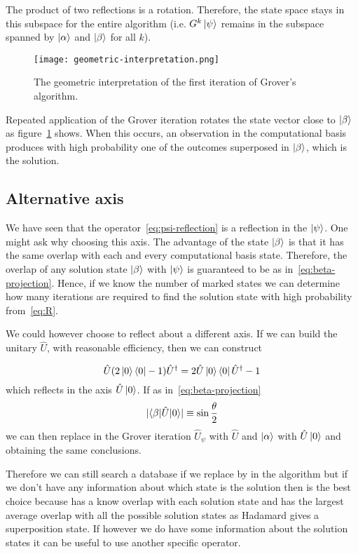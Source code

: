 The product of two reflections is a rotation. Therefore, the state space stays in this subspace for the entire algorithm (i.e. $G^k\ket{\psi}$ remains in the subspace spanned by $\ket{\alpha}$ and $\ket{\beta}$ for all $k$). 

\begin{figure}
\texttt{[image: geometric-interpretation.png]}
\centering
\caption{The geometric interpretation of the first iteration of Grover's algorithm.}
\label{fig:geometric-interpretation}
\end{figure}

Repeated application of the Grover iteration rotates the state vector close to $\ket{\beta}$ as figure~\ref{fig:geometric-interpretation} shows. When this occurs, an observation in the computational basis produces with high probability one of the outcomes superposed in $\ket{\beta}$, which is the solution.

\subsection{Alternative axis}
We have seen that the operator~\ref{eq:psi-reflection} is a reflection in the $\ket{\psi}$. One might ask why choosing this axis. The advantage of the state $\ket{\beta}$ is that it has the same overlap with each and every computational basis state. Therefore, the overlap of any solution state $\ket{\beta}$ with $\ket{\psi}$ is guaranteed to be as in~\ref{eq:beta-projection}. Hence, if we know the number of marked states we can determine how many iterations are required to find the solution state with high probability from~\ref{eq:R}.

We could however choose to reflect about a different axis. If we can build the unitary $\hat{U}$, with reasonable efficiency, then we can construct

\begin{equation}
    \hat{U}(2\ket{0}\bra{0}-1)\hat{U}^\dag = 2\hat{U}\ket{0}\bra{0}\hat{U}^\dag -1
\end{equation}
which reflects in the axis $\hat{U}\ket{0}$.
If as in~\ref{eq:beta-projection}
\begin{equation*}
    \lvert\braket{\beta | \hat{U} |0}\rvert \equiv \sin\frac{\theta}{2}
\end{equation*}
we can then replace in the Grover iteration  $\hat{U}_\psi$ with $\hat{U}$ and $\ket{\alpha}$ with $\hat{U}\ket{0}$ and obtaining the same conclusions.

Therefore we can still search a database if we replace by in the algorithm but if we don't have any information about which state is the solution then is the best choice because has a know overlap with each solution state and has the largest average overlap with all the possible solution states as Hadamard gives a superposition state. If however we do have some information about the solution states it can be useful to use another specific operator.